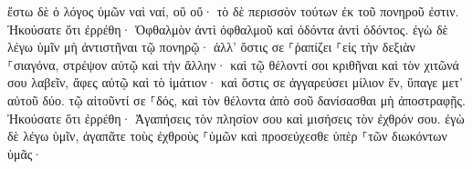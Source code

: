 \documentclass{openreader}
\begin{document}
ἔστω δὲ ὁ λόγος ὑμῶν ναὶ ναί, οὒ οὔ· τὸ δὲ περισσὸν τούτων ἐκ τοῦ πονηροῦ ἐστιν. 
Ἠκούσατε ὅτι ἐρρέθη· Ὀφθαλμὸν ἀντὶ ὀφθαλμοῦ καὶ ὀδόντα ἀντὶ ὀδόντος. 
ἐγὼ δὲ λέγω ὑμῖν μὴ ἀντιστῆναι τῷ πονηρῷ· ἀλλ’ ὅστις σε ⸀ῥαπίζει ⸀εἰς τὴν δεξιὰν ⸀σιαγόνα, στρέψον αὐτῷ καὶ τὴν ἄλλην· 
καὶ τῷ θέλοντί σοι κριθῆναι καὶ τὸν χιτῶνά σου λαβεῖν, ἄφες αὐτῷ καὶ τὸ ἱμάτιον· 
καὶ ὅστις σε ἀγγαρεύσει μίλιον ἕν, ὕπαγε μετ’ αὐτοῦ δύο. 
τῷ αἰτοῦντί σε ⸀δός, καὶ τὸν θέλοντα ἀπὸ σοῦ δανίσασθαι μὴ ἀποστραφῇς. 
Ἠκούσατε ὅτι ἐρρέθη· Ἀγαπήσεις τὸν πλησίον σου καὶ μισήσεις τὸν ἐχθρόν σου. 
ἐγὼ δὲ λέγω ὑμῖν, ἀγαπᾶτε τοὺς ἐχθροὺς ⸀ὑμῶν καὶ προσεύχεσθε ὑπὲρ ⸀τῶν διωκόντων ὑμᾶς· 
\end{document}
